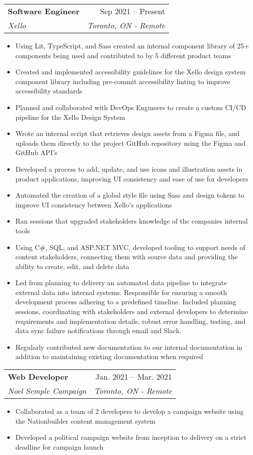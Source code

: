 \documentclass[letterpaper,11pt]{article}
\makeatletter
\newcommand{\resumeItem}[1]{
  \item\small{
    {#1 \vspace{-2pt}}
  }
}
\newcommand{\resumeSubheading}[4]{
  \vspace{-2pt}\item
    \begin{tabular*}{0.97\textwidth}[t]{l@{\extracolsep{\fill}}r}
      \textbf{#1} & #2 \\
      \textit{\small#3} & \textit{\small #4} \\
    \end{tabular*}\vspace{-7pt}
}
\newcommand{\resumeSubSubheading}[2]{
    \item
    \begin{tabular*}{0.97\textwidth}{l@{\extracolsep{\fill}}r}
      \textit{\small#1} & \textit{\small #2} \\
    \end{tabular*}\vspace{-7pt}
}
\newcommand{\resumeSubHeadingListEnd}{\end{itemize}}
\newcommand{\resumeItemListStart}{\begin{itemize}}
\newcommand{\resumeItemListEnd}{\end{itemize}\vspace{-5pt}}
\makeatother
\begin{document}
    \resumeSubheading
      {Software Engineer}{Sep 2021 -- Present}
      {Xello}{Toronto, ON - Remote}
      \resumeItemListStart
        \resumeItem{Using Lit, TypeScript, and Sass created an internal component library of 25+ components being used and contributed to by 5 different product teams}
        \resumeItem{Created and implemented accessibility guidelines for the Xello design system component library including pre-commit accessibility linting to improve accessibility standards}
        \resumeItem{Planned and collaborated with DevOps Engineers to create a custom CI/CD pipeline for the Xello Design System}
        \resumeItem{Wrote an internal script that retrieves design assets from a Figma file, and uploads them directly to the project GitHub repository using the Figma and GitHub API's}
        \resumeItem{Developed a process to add, update, and use icons and illustration assets in product applications, improving UI consistency and ease of use for developers}
        \resumeItem{Automated the creation of a global style file using Sass and design tokens to improve UI consistency between Xello’s applications}
        \resumeItem{Ran sessions that upgraded stakeholders knowledge of the companies internal tools }
        \resumeItem{Using C\#, SQL, and ASP.NET MVC, developed tooling to support needs of content stakeholders, connecting them with source data and providing the ability to create, edit, and delete data}
        \resumeItem{Led from planning to delivery an automated data pipeline to integrate external data into internal systems. Responsible for ensuring a smooth development process adhering to a predefined timeline. Included planning sessions, coordinating with stakeholders and external developers to determine requirements and implementation details, robust error handling, testing, and data sync failure notifications through email and Slack. }
        \resumeItem{Regularly contributed new documentation to our internal documentation in addition to maintaining existing documentation when required }
      \resumeItemListEnd
      

    \resumeSubheading
      {Web Developer}{Jan. 2021 -- Mar. 2021}
      {Noel Semple Campaign}{Toronto, ON - Remote}
      \resumeItemListStart
        \resumeItem{Collaborated as a team of 2 developers to develop a campaign website using the Nationbuilder content management system}
        \resumeItem{Developed a political campaign website from inception to delivery on a strict deadline for campaign launch}
    \resumeItemListEnd
\end{document}
